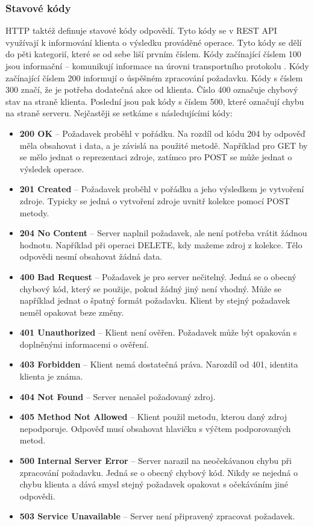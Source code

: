 \documentclass[thesis=M,czech]{FITthesis}[2019/12/23]
\begin{document}
\subsubsection*{Stavové kódy}
HTTP taktéž definuje stavové kódy odpovědí. Tyto kódy se v REST API využívají k informování klienta o výsledku prováděné operace. Tyto kódy se dělí do pěti kategorií, které se od sebe liší prvním číslem. Kódy začínající číslem 100 jsou informační -- komunikují informace na úrovni transportního protokolu \cite{http_codes}. Kódy začínající číslem 200 informují o úspěšném zpracování požadavku. Kódy s číslem 300 značí, že je potřeba dodatečná akce od klienta. Číslo 400 označuje chybový stav na straně klienta. Poslední jsou pak kódy s číslem 500, které označují chybu na straně serveru. Nejčastěji se setkáme s následujícími kódy:
\begin{itemize}
    \item \textbf{200 OK} -- Požadavek proběhl v pořádku. Na rozdíl od kódu 204 by odpověď měla obsahovat i data, a je závislá na použité metodě. Například pro GET by se mělo jednat o reprezentaci zdroje, zatímco pro POST se může jednat o výsledek operace.
    \item \textbf{201 Created} -- Požadavek proběhl v pořádku a jeho výsledkem je vytvoření zdroje. Typicky se jedná o vytvoření zdroje uvnitř kolekce pomocí POST metody.
    \item \textbf{204 No Content} -- Server naplnil požadavek, ale není potřeba vrátit žádnou hodnotu. Například při operaci DELETE, kdy mažeme zdroj z kolekce. Tělo odpovědi nesmí obsahovat žádná data.
    \item \textbf{400 Bad Request} -- Požadavek je pro server nečitelný. Jedná se o obecný chybový kód, který se použije, pokud žádný jiný není vhodný. Může se například jednat o špatný formát požadavku. Klient by stejný požadavek neměl opakovat beze změny.
    \item \textbf{401 Unauthorized} -- Klient není ověřen. Požadavek může být opakován s doplněnými informacemi o ověření.
    \item \textbf{403 Forbidden} -- Klient nemá dostatečná práva. Narozdíl od 401, identita klienta je známa.
    \item \textbf{404 Not Found} -- Server nenašel požadovaný zdroj.
    \item \textbf{405 Method Not Allowed} -- Klient použil metodu, kterou daný zdroj nepodporuje. Odpověď musí obsahovat hlavičku s výčtem podporovaných metod.
    \item \textbf{500 Internal Server Error} -- Server narazil na neočekávanou chybu při zpracování požadavku. Jedná se o obecný chybový kód. Nikdy se nejedná o chybu klienta a dává smysl stejný požadavek opakovat s očekáváním jiné odpovědi.
    \item \textbf{503 Service Unavailable} -- Server není připravený zpracovat požadavek.
\end{itemize}
\end{document}
